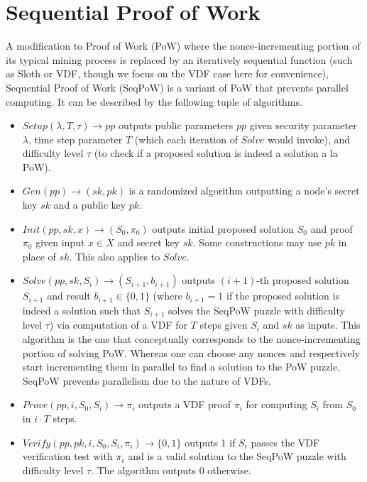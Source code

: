 \documentclass[letterpaper,twocolumn,10pt]{article}
\theoremstyle{definition}
\theoremstyle{remark}
\begin{document}
\section{Sequential Proof of Work}
A modification to Proof of Work (PoW) where the nonce-incrementing portion of its typical mining process is replaced by an iteratively sequential function (such as Sloth \cite{lenstra2015random} or VDF, though we focus on the VDF case here for convenience), Sequential Proof of Work (SeqPoW) \cite{han2020randchain} is a variant of PoW that prevents parallel computing. It can be described by the following tuple of algorithms.
\begin{itemize}
\item $Setup(\lambda, T, \tau) \rightarrow pp$ outputs public parameters $pp$ given security parameter $\lambda$, time step parameter $T$ (which each iteration of $Solve$ would invoke), and difficulty level $\tau$ (to check if a proposed solution is indeed a solution a la PoW).
\item $Gen(pp) \rightarrow (sk, pk)$ is a randomized algorithm outputting a node's secret key $sk$ and a public key $pk$.
\item $Init(pp, sk, x) \rightarrow (S_0, \pi_0)$ outputs initial proposed solution $S_0$ and proof $\pi_0$ given input $x \in X$ and secret key $sk$. Some constructions may use $pk$ in place of $sk$. This also applies to $Solve$.
\item $Solve(pp, sk, S_i) \rightarrow (S_{i + 1}, b_{i + 1})$ outputs $(i + 1)$-th proposed solution $S_{i + 1}$ and result $b_{i + 1} \in \{0, 1\}$ (where $b_{i + 1} = 1$ if the proposed solution is indeed a solution such that $S_{i + 1}$ solves the SeqPoW puzzle with difficulty level $\tau$) via computation of a VDF for $T$ steps given $S_i$ and $sk$ as inputs. This algorithm is the one that conceptually corresponds to the nonce-incrementing portion of solving PoW. Whereas one can choose any nonces and respectively start incrementing them in parallel to find a solution to the PoW puzzle, SeqPoW prevents parallelism due to the nature of VDFs.
\item $Prove(pp, i, S_0, S_i) \rightarrow \pi_i$ outputs a VDF proof $\pi_i$ for computing $S_i$ from $S_0$ in $i \cdot T$ steps.
\item $Verify(pp, pk, i, S_0, S_i, \pi_i) \rightarrow \{0, 1\}$ outputs 1 if $S_i$ passes the VDF verification test with $\pi_i$ and is a valid solution to the SeqPoW puzzle with difficulty level $\tau$. The algorithm outputs 0 otherwise.
\end{itemize}
\end{document}
